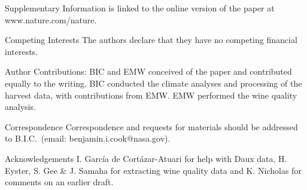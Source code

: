 \documentclass[final]{nature}
\begin{document}
\pagebreak 
\begin{addendum}
 \item [Supplementary Information] is linked to the online version of the paper at www.nature.com/nature.
 \item[Competing Interests] The authors declare that they have no competing financial interests.
\item [Author Contributions:] BIC and EMW conceived of the paper and contributed equally to the writing. BIC conducted the climate analyses and processing of the harvest data, with contributions from EMW. EMW performed the wine quality analysis.
 \item[Correspondence] Correspondence and requests for materials
should be addressed to B.I.C.~(email: benjamin.i.cook@nasa.gov).
 \item[Acknowledgements] I. Garc\'ia de Cort\'azar-Atuari for help with Daux data, H. Eyster, S. Gee \& J. Samaha for extracting wine quality data and K. Nicholas for comments on an earlier draft.
\end{addendum}
\end{document}

